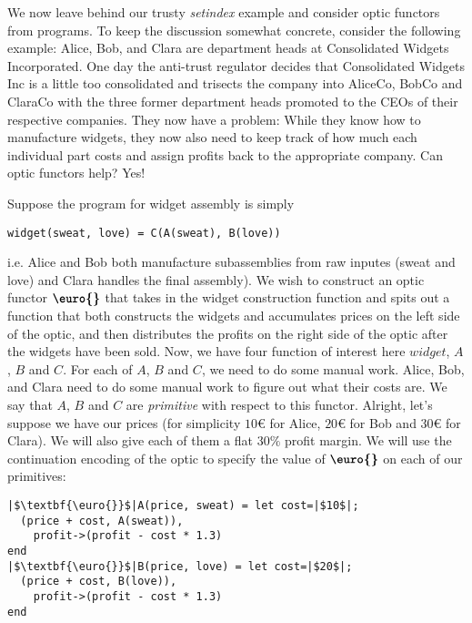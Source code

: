 \documentclass[letterpaper, 10 pt, conference]{ieeeconf}  %
\begin{document}
We now leave behind our trusty \textit{setindex} example and consider optic
functors from programs. To keep the discussion somewhat concrete, consider
the following example: Alice, Bob, and Clara are department heads at
Consolidated Widgets Incorporated. One day the anti-trust regulator decides that
Consolidated Widgets Inc is a little too consolidated and trisects the company
into AliceCo, BobCo and ClaraCo with the three former department heads promoted
to the CEOs of their respective companies. They now have a problem: While they
know how to manufacture widgets, they now also need to keep track of how much
each individual part costs and assign profits back to the appropriate company.
Can optic functors help? Yes!

Suppose the program for widget assembly is simply

\begin{center}
\begin{verbatim}
widget(sweat, love) = C(A(sweat), B(love))
\end{verbatim}
\end{center}

i.e. Alice and Bob both manufacture subassemblies from raw inputes (sweat and love) and Clara handles
the final assembly). We wish to construct an optic functor $\textbf{\euro{}}$ that
takes in the widget construction function and spits out a function that both
constructs the widgets and accumulates prices on the left side of the optic,
and then distributes the profits on the right side of the optic after the widgets
have been sold. Now, we have four function of interest here $widget$, $A$, $B$
and $C$. For each of $A$, $B$ and $C$, we need to do some manual work.
Alice, Bob, and Clara need to do some manual work to figure out what their costs are.
We say that $A$, $B$ and $C$ are \textit{primitive} with respect to this functor.
Alright, let's suppose we have our prices (for simplicity $10\euro{}$ for Alice,
$20\euro{}$ for Bob and $30\euro{}$ for Clara). We will also give each of them
a flat $30\%$ profit margin. We will use the continuation
encoding of the optic to specify the value of $\textbf{\euro{}}$ on each of our
primitives:

\begin{verbatim}
|$\textbf{\euro{}}$|A(price, sweat) = let cost=|$10$|;
  (price + cost, A(sweat)),
    profit->(profit - cost * 1.3)
end
|$\textbf{\euro{}}$|B(price, love) = let cost=|$20$|;
  (price + cost, B(love)),
    profit->(profit - cost * 1.3)
end
\end{verbatim}
\end{document}
